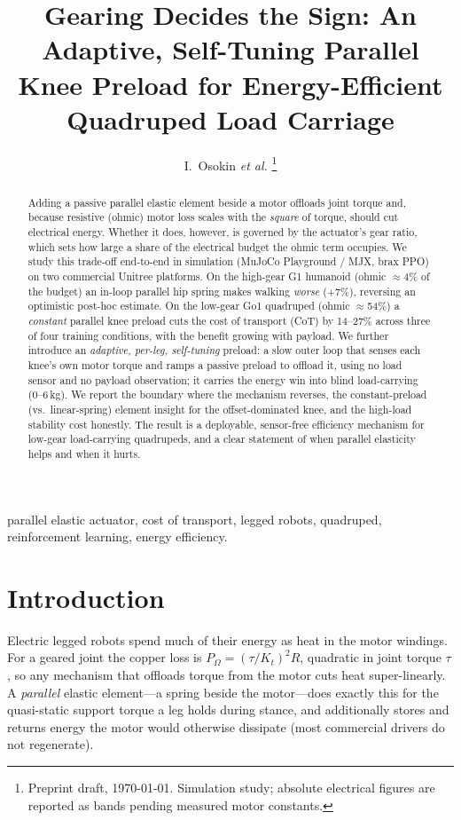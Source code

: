 \documentclass[journal]{IEEEtran}
\begin{document}
\title{Gearing Decides the Sign: An Adaptive, Self-Tuning Parallel Knee Preload for
Energy-Efficient Quadruped Load Carriage}

\author{I.~Osokin \emph{et al.}%
\thanks{Preprint draft, \today. Simulation study; absolute electrical figures are reported as bands
pending measured motor constants.}}

\maketitle

\begin{abstract}
Adding a passive parallel elastic element beside a motor offloads joint torque and, because resistive
(ohmic) motor loss scales with the \emph{square} of torque, should cut electrical energy. Whether it does,
however, is governed by the actuator's gear ratio, which sets how large a share of the electrical budget the
ohmic term occupies. We study this trade-off end-to-end in simulation (MuJoCo Playground / MJX, brax PPO) on
two commercial Unitree platforms. On the high-gear G1 humanoid (ohmic $\approx$4\% of the budget) an in-loop
parallel hip spring makes walking \emph{worse} (+7\%), reversing an optimistic post-hoc estimate. On the
low-gear Go1 quadruped (ohmic $\approx$54\%) a \emph{constant} parallel knee preload cuts the cost of transport
(CoT) by 14--27\% across three of four training conditions, with the benefit growing with payload. We further
introduce an \emph{adaptive, per-leg, self-tuning} preload: a slow outer loop that senses each knee's own motor
torque and ramps a passive preload to offload it, using no load sensor and no payload observation; it carries
the energy win into blind load-carrying (0--6\,kg). We report the boundary where the mechanism reverses, the
constant-preload (vs.\ linear-spring) element insight for the offset-dominated knee, and the high-load
stability cost honestly. The result is a deployable, sensor-free efficiency mechanism for low-gear load-carrying
quadrupeds, and a clear statement of when parallel elasticity helps and when it hurts.
\end{abstract}

\begin{IEEEkeywords}
parallel elastic actuator, cost of transport, legged robots, quadruped, reinforcement learning, energy efficiency.
\end{IEEEkeywords}

\section{Introduction}
Electric legged robots spend much of their energy as heat in the motor windings. For a geared joint the
copper loss is $P_\Omega = (\tau/K_t)^2 R$, quadratic in joint torque $\tau$, so any mechanism that offloads
torque from the motor cuts heat super-linearly. A \emph{parallel} elastic element---a spring beside the
motor---does exactly this for the quasi-static support torque a leg holds during stance, and additionally stores
and returns energy the motor would otherwise dissipate (most commercial drivers do not regenerate).
\end{document}
